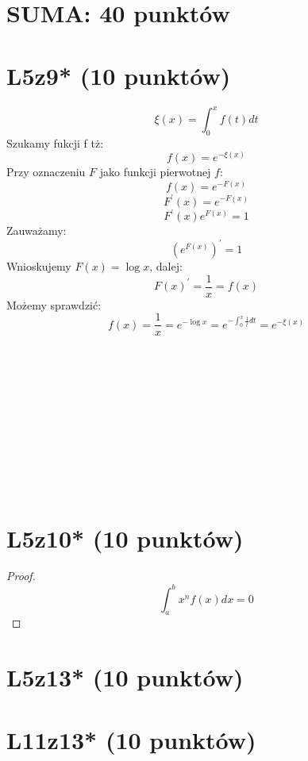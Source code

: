 \documentclass{article}
\title{}
\date{08.06.2020}
\author{Maurycy Borkowski}
\begin{document}
\maketitle

\section{SUMA: 40 punktów}
\section{L5z9* (10 punktów)}
$$
\xi(x) = \int_0^x{f(t)dt}
$$
Szukamy fukcji f tż:
$$
f(x) = e^{-\xi(x)}
$$
Przy oznaczeniu $F$ jako funkcji pierwotnej $f$:
$$
f(x) = e^{-F(x)}
$$
$$
F^\prime(x) = e^{-F(x)}
$$
$$
F^\prime(x)e^{F(x)} = 1
$$
Zauważamy:
$$
\left( e^{F(x)} \right)^\prime = 1
$$
Wnioskujemy $F(x) = \log x$, dalej:
$$
F(x)^\prime = \frac{1}{x} = f(x)
$$
Możemy sprawdzić:
$$
f(x) = \frac{1}{x} = e^{-\log x} = e^{-\int_0^x{\frac{1}{t}dt}} = e^{-\xi(x)}
$$\\\\\\\\\\\\\\\\\\\
\section{L5z10* (10 punktów)}
\begin{proof}
$$
\int_a^b x^n f(x)dx = 0
$$
\end{proof}
\section{L5z13* (10 punktów)}
\section{L11z13* (10 punktów)}
\end{document}
